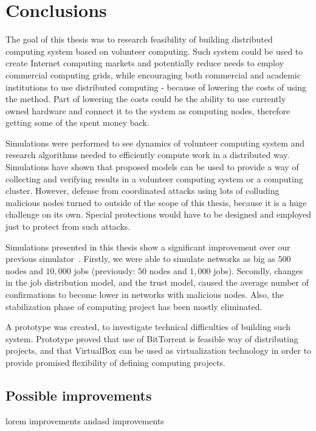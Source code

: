 \chapter{Conclusions}

The goal of this thesis was to research feasibility of building distributed computing system based on volunteer computing. Such system could be used to create Internet computing markets and potentially reduce needs to employ commercial computing grids, while encouraging both commercial and academic institutions to use distributed computing - because of lowering the costs of using the method. Part of lowering the costs could be the ability to use currently owned hardware and connect it to the system as computing nodes, therefore getting some of the spent money back.

Simulations were performed to see dynamics of volunteer computing system and research algorithms needed to efficiently compute work in a distributed way. Simulations have shown that proposed models can be used to provide a way of collecting and verifying results in a volunteer computing system or a computing cluster. However, defense from coordinated attacks using lots of colluding malicious nodes turned to outside of the scope of this thesis, because it is a huge challenge on its own. Special protections would have to be designed and employed just to protect from such attacks.

Simulations presented in this thesis show a significant improvement over our previous simulator~\cite{zochniakreliable}. Firstly, we were able to simulate networks as big as $500$ nodes and $10,000$ jobs (previously: $50$ nodes and $1,000$ jobs). Secondly, changes in the job distribution model, and the trust model, caused the average number of confirmations to become lower in networks with malicious nodes. Also, the stabilization phase of computing project has been mostly eliminated.

A prototype was created, to investigate technical difficulties of building such system. Prototype proved that use of BitTorrent is feasible way of distributing projects, and that VirtualBox can be used as virtualization technology in order to provide promised flexibility of defining computing projects. 

\section*{Possible improvements}

lorem improvements andasd improvements